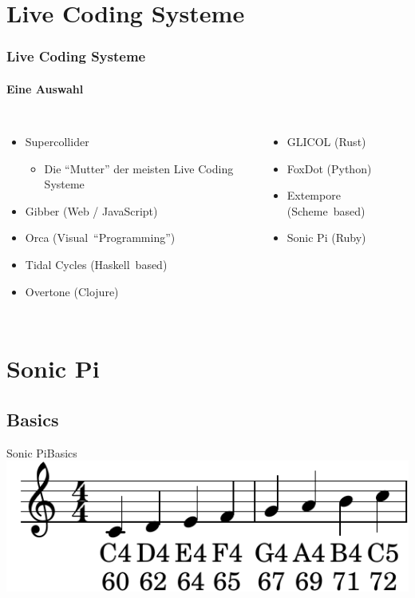 \documentclass{beamer}
\begin{document}
\section{Live Coding Systeme}
\begin{frame}
  \frametitle{Live Coding Systeme}
  \framesubtitle{Eine Auswahl}
  \begin{columns}
    \begin{itemize}
      \item Supercollider
        \begin{itemize}
          \item Die ``Mutter'' der meisten Live Coding Systeme
        \end{itemize}
      \item Gibber (Web / JavaScript)
      \item Orca (Visual~``Programming'')
      \item Tidal Cycles (Haskell~based)
      \item Overtone (Clojure)
    \end{itemize}

    \begin{itemize}
      \item GLICOL (Rust)
      \item FoxDot (Python)
      \item Extempore (Scheme~based)
      \item Sonic Pi (Ruby)
    \end{itemize}
  \end{columns}
\end{frame}

\section{Sonic Pi}
\subsection{Basics}
\begin{frame}{Sonic Pi}{Basics}
  \includegraphics{images/scale.pdf}
\end{frame}
\end{document}
